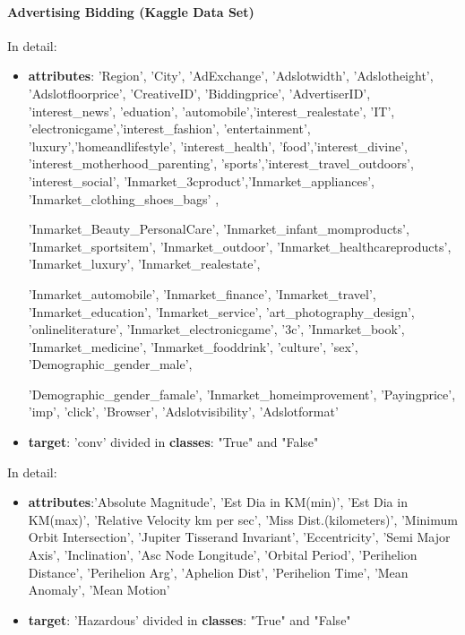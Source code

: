 \documentclass{article}
\begin{document}
\paragraph{Advertising Bidding (Kaggle Data Set)}

In detail:
\begin{itemize}
	\item  \textbf{attributes}: 'Region', 'City', 'AdExchange', 'Adslotwidth', 'Adslotheight', 'Adslotfloorprice',
	'CreativeID', 'Biddingprice', 'AdvertiserID', 'interest\_news', 'eduation', 'automobile','interest\_realestate', 'IT', 'electronicgame','interest\_fashion', 'entertainment', 'luxury','homeandlifestyle', 'interest\_health', 'food','interest\_divine', 'interest\_motherhood\_parenting', 'sports','interest\_travel\_outdoors', 'interest\_social', 'Inmarket\_3cproduct','Inmarket\_appliances', 'Inmarket\_clothing\_shoes\_bags' ,

	'Inmarket\_Beauty\_PersonalCare', 'Inmarket\_infant\_momproducts',
	'Inmarket\_sportsitem', 'Inmarket\_outdoor', 'Inmarket\_healthcareproducts',
	'Inmarket\_luxury', 'Inmarket\_realestate',

	'Inmarket\_automobile',
	'Inmarket\_finance', 'Inmarket\_travel', 'Inmarket\_education',
	'Inmarket\_service', 'art\_photography\_design',
	'onlineliterature', 'Inmarket\_electronicgame', '3c',
	'Inmarket\_book', 'Inmarket\_medicine', 'Inmarket\_fooddrink',
	'culture', 'sex',
	'Demographic\_gender\_male',

	'Demographic\_gender\_famale', 'Inmarket\_homeimprovement', 'Payingprice',
	'imp', 'click', 'Browser', 'Adslotvisibility', 'Adslotformat' \\

	\item  \textbf{target}: 'conv' divided in \textbf{classes}: "True" and "False"
\end{itemize}

In detail:
\begin{itemize}
	\item  \textbf{attributes}:'Absolute Magnitude', 'Est Dia in KM(min)', 'Est Dia in KM(max)', 'Relative Velocity km per sec', 'Miss Dist.(kilometers)', 'Minimum Orbit Intersection', 'Jupiter Tisserand Invariant', 'Eccentricity', 'Semi Major Axis', 'Inclination', 'Asc Node Longitude', 'Orbital Period', 'Perihelion   Distance', 'Perihelion Arg', 'Aphelion Dist', 'Perihelion Time', 'Mean Anomaly', 'Mean Motion' \\

	\item  \textbf{target}: 'Hazardous' divided in \textbf{classes}: "True" and "False"
\end{itemize}
\end{document}
